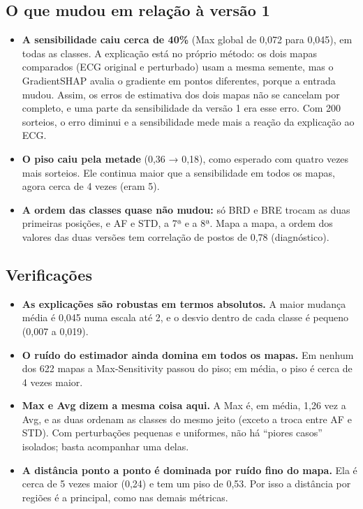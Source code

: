\documentclass[11pt,a4paper]{article}
\begin{document}
\subsection{O que mudou em relação à versão 1}
\begin{itemize}
\item \textbf{A sensibilidade caiu cerca de 40\%} (Max global de 0,072 para 0,045), em todas as classes. A explicação está no próprio método: os dois mapas comparados (ECG original e perturbado) usam a mesma semente, mas o GradientSHAP avalia o gradiente em pontos diferentes, porque a entrada mudou. Assim, os erros de estimativa dos dois mapas não se cancelam por completo, e uma parte da sensibilidade da versão 1 era esse erro. Com 200 sorteios, o erro diminui e a sensibilidade mede mais a reação da explicação ao ECG.
\item \textbf{O piso caiu pela metade} (0,36 → 0,18), como esperado com quatro vezes mais sorteios. Ele continua maior que a sensibilidade em todos os mapas, agora cerca de 4 vezes (eram 5).
\item \textbf{A ordem das classes quase não mudou:} só BRD e BRE trocam as duas primeiras posições, e AF e STD, a 7ª e a 8ª. Mapa a mapa, a ordem dos valores das duas versões tem correlação de postos de 0,78 (diagnóstico).
\end{itemize}

\subsection{Verificações}
\begin{itemize}
\item \textbf{As explicações são robustas em termos absolutos.} A maior mudança média é 0,045 numa escala até 2, e o desvio dentro de cada classe é pequeno (0,007 a 0,019).
\item \textbf{O ruído do estimador ainda domina em todos os mapas.} Em nenhum dos 622 mapas a Max-Sensitivity passou do piso; em média, o piso é cerca de 4 vezes maior.
\item \textbf{Max e Avg dizem a mesma coisa aqui.} A Max é, em média, 1,26 vez a Avg, e as duas ordenam as classes do mesmo jeito (exceto a troca entre AF e STD). Com perturbações pequenas e uniformes, não há “piores casos” isolados; basta acompanhar uma delas.
\item \textbf{A distância ponto a ponto é dominada por ruído fino do mapa.} Ela é cerca de 5 vezes maior (0,24) e tem um piso de 0,53. Por isso a distância por regiões é a principal, como nas demais métricas.
\end{itemize}
\end{document}
